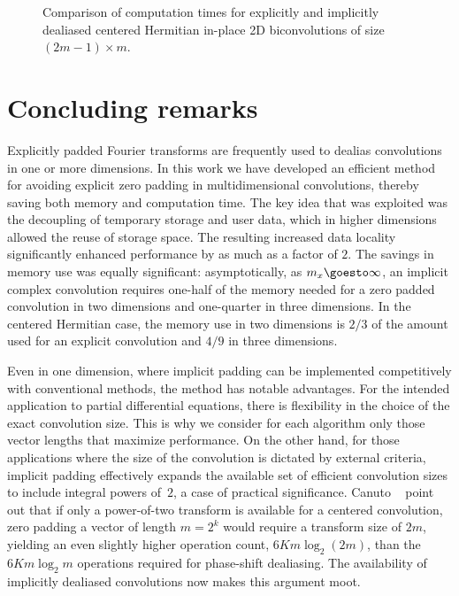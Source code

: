 \documentclass[final]{siamltex}
\begin{document}
\begin{figure}[htbp]
\begin{minipage}{0.49\linewidth}
\begin{center}
\caption{Comparison of computation times for explicitly and implicitly
dealiased centered Hermitian in-place 2D biconvolutions of size $(2m-1)\times m$.}
\label{timing2b}
\end{center}
\end{minipage}
\end{figure}

\section{Concluding remarks}
Explicitly padded Fourier transforms are frequently used to dealias
convolutions in one or more dimensions.
In this work we have developed an efficient method for avoiding explicit zero
padding in multidimensional convolutions, thereby saving both memory and
computation time. The key idea that was exploited was the decoupling
of temporary storage and user data, which in higher dimensions allowed
the reuse of storage space. The resulting increased data locality
significantly enhanced performance by as much as a factor of $2$.
The savings in memory use was equally significant: asymptotically, as
$m_x\goesto\infty$, an implicit complex convolution requires one-half of
the memory needed for a zero padded convolution in two dimensions and
one-quarter in three dimensions. In the centered Hermitian case, the memory
use in two dimensions is $2/3$ of the amount used for an explicit
convolution and $4/9$ in three dimensions. 

Even in one dimension, where implicit padding can be implemented
competitively with conventional methods, the method has notable advantages.
For the intended application to partial differential
equations, there is flexibility in the choice of the exact convolution
size. This is why we consider for each algorithm only those vector lengths
that maximize performance.
On the other hand, for those applications where the size of the convolution
is dictated by external criteria, implicit padding effectively expands the
available set of efficient convolution sizes to include integral powers
of~$2$, a case of practical significance.
Canuto \etal~\cite[p.136]{Canuto06} point out that if only a
power-of-two transform is available for a centered convolution, zero
padding a vector of length $m=2^k$  would require a transform size of $2m$,
yielding an even slightly higher operation count, $6Km\log_2(2m)$, than the $6K
m\log_2m$ operations required for phase-shift dealiasing. The availability
of implicitly dealiased convolutions now makes this argument moot.
\end{document}
